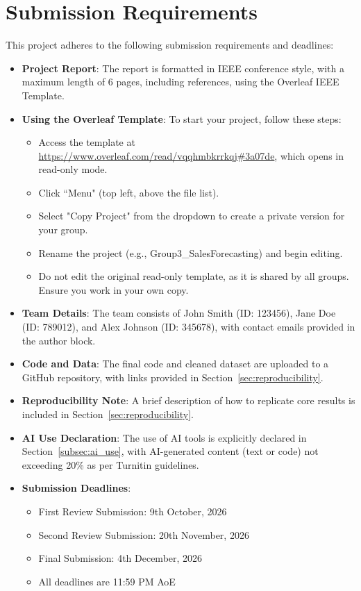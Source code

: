 \documentclass[conference]{IEEEtran}
\begin{document}
\section{Submission Requirements}
This project adheres to the following submission requirements and deadlines:
\begin{itemize}
    \item \textbf{Project Report}: The report is formatted in IEEE conference style, with a maximum length of 6 pages, including references, using the Overleaf IEEE Template.
    \item \textbf{Using the Overleaf Template}: To start your project, follow these steps:
    \begin{itemize}
        \item Access the template at \url{https://www.overleaf.com/read/vqqhmbkrrkqj#3a07de}, which opens in read-only mode.
        \item Click ``Menu" (top left, above the file list).
        \item Select "Copy Project" from the dropdown to create a private version for your group.
        \item Rename the project (e.g., Group3\_SalesForecasting) and begin editing.
        \item Do not edit the original read-only template, as it is shared by all groups. Ensure you work in your own copy.
    \end{itemize}
    \item \textbf{Team Details}: The team consists of John Smith (ID: 123456), Jane Doe (ID: 789012), and Alex Johnson (ID: 345678), with contact emails provided in the author block.
    \item \textbf{Code and Data}: The final code and cleaned dataset are uploaded to a GitHub repository, with links provided in Section~\ref{sec:reproducibility}.
    \item \textbf{Reproducibility Note}: A brief description of how to replicate core results is included in Section~\ref{sec:reproducibility}.
    \item \textbf{AI Use Declaration}: The use of AI tools is explicitly declared in Section~\ref{subsec:ai_use}, with AI-generated content (text or code) not exceeding 20\% as per Turnitin guidelines.
    \item \textbf{Submission Deadlines}:
    \begin{itemize}
        \item First Review Submission: 9th October, 2026
        \item Second Review Submission: 20th November, 2026
        \item Final Submission: 4th December, 2026
        \item All deadlines are 11:59 PM AoE
    \end{itemize}
\end{itemize}
\end{document}
